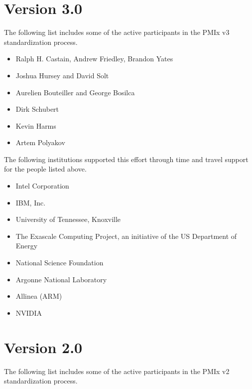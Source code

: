 \section{Version 3.0}

The following list includes some of the active participants in the PMIx v3 standardization process.

\begin{itemize}
\item Ralph H. Castain, Andrew Friedley, Brandon Yates
\item Joshua Hursey and David Solt
\item Aurelien Bouteiller and George Bosilca
\item Dirk Schubert
\item Kevin Harms
\item Artem Polyakov
\end{itemize}

The following institutions supported this effort through time and travel support for the people listed above.

\begin{itemize}
\item Intel Corporation
\item IBM, Inc.
\item University of Tennessee, Knoxville
\item The Exascale Computing Project, an initiative of the US Department of Energy
\item National Science Foundation
\item Argonne National Laboratory
\item Allinea (ARM)
\item NVIDIA
\end{itemize}

\section{Version 2.0}

The following list includes some of the active participants in the PMIx v2 standardization process.

